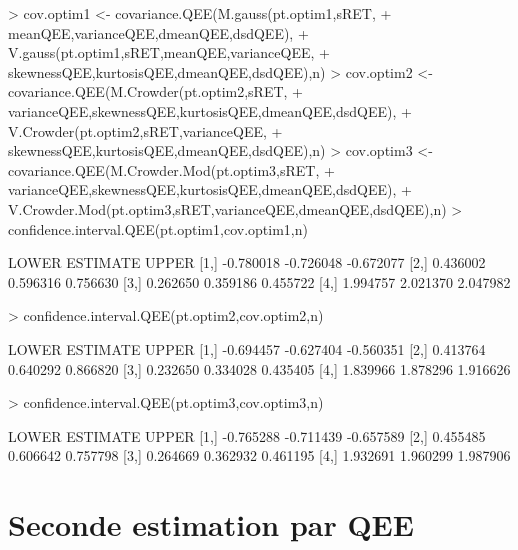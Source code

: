 \documentclass[letter]{report}
\begin{document}
\begin{Schunk}
\begin{Sinput}
> cov.optim1 <- covariance.QEE(M.gauss(pt.optim1,sRET,
+ 				meanQEE,varianceQEE,dmeanQEE,dsdQEE),
+ 		V.gauss(pt.optim1,sRET,meanQEE,varianceQEE,
+ 				skewnessQEE,kurtosisQEE,dmeanQEE,dsdQEE),n)
> cov.optim2 <- covariance.QEE(M.Crowder(pt.optim2,sRET,
+ 				varianceQEE,skewnessQEE,kurtosisQEE,dmeanQEE,dsdQEE),
+ 		V.Crowder(pt.optim2,sRET,varianceQEE,
+ 				skewnessQEE,kurtosisQEE,dmeanQEE,dsdQEE),n)
> cov.optim3 <- covariance.QEE(M.Crowder.Mod(pt.optim3,sRET,
+ 				varianceQEE,skewnessQEE,kurtosisQEE,dmeanQEE,dsdQEE),
+ 		V.Crowder.Mod(pt.optim3,sRET,varianceQEE,dmeanQEE,dsdQEE),n)
> confidence.interval.QEE(pt.optim1,cov.optim1,n)
\end{Sinput}
\begin{Soutput}
         LOWER  ESTIMATE     UPPER
[1,] -0.780018 -0.726048 -0.672077
[2,]  0.436002  0.596316  0.756630
[3,]  0.262650  0.359186  0.455722
[4,]  1.994757  2.021370  2.047982
\end{Soutput}
\begin{Sinput}
> confidence.interval.QEE(pt.optim2,cov.optim2,n)
\end{Sinput}
\begin{Soutput}
         LOWER  ESTIMATE     UPPER
[1,] -0.694457 -0.627404 -0.560351
[2,]  0.413764  0.640292  0.866820
[3,]  0.232650  0.334028  0.435405
[4,]  1.839966  1.878296  1.916626
\end{Soutput}
\begin{Sinput}
> confidence.interval.QEE(pt.optim3,cov.optim3,n)
\end{Sinput}
\begin{Soutput}
         LOWER  ESTIMATE     UPPER
[1,] -0.765288 -0.711439 -0.657589
[2,]  0.455485  0.606642  0.757798
[3,]  0.264669  0.362932  0.461195
[4,]  1.932691  1.960299  1.987906
\end{Soutput}
\end{Schunk}

\section{Seconde estimation par QEE}

\begin{Schunk}
\end{Schunk}
\end{document}
